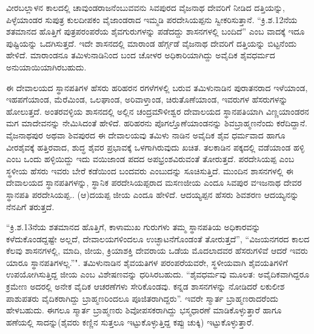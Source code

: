 ವೀರಬಲ್ಲಾಳನ ಕಾಲದಲ್ಲಿ ಚಾವುಂಡರಾಜನೆಂಬುವವನು ಸಿವಪುರದ ವೈಜನಾಥ ದೇವರಿಗೆ ನೀಡಿದ ದತ್ತಿಯನ್ನು, ಪಿಳ್ಳೆಯಾಂಡರ ಸುಪುತ್ರ ಕುಲದೀಪಕಂ ವೈಜಾಂಡರಾದ ಇಮ್ಮಡಿ ಪರದೇಸಿಯಪ್ಪನು ಸ್ವೀಕರಿಸುತ್ತಾನೆ. “ಕ್ರಿ.ಶ.12ನೆಯ ಶತಮಾನದ ಹೊತ್ತಿಗೆ ಪುತ್ರಪರಂಪರೆಯ ಶೈವಗುರುಗಳನ್ನು ಪಡೆದದ್ದು ಶಾಸನಗಳಲ್ಲಿ ಬಂದಿದೆ” ಎಂಬ ವಾದಕ್ಕೆ ಇದೂ ಪುಷ್ಟಿಯನ್ನು ಒದಗಿಸುತ್ತದೆ. ಇದೇ ಶಾಸನದಲ್ಲಿ ಮಾರಾಂಡ ಹೆರ್ಗ್ಗಡೆ ವೈಜನಾಥ ದೇವರಿಗೆ ದತ್ತಿಯನ್ನು ಬಿಟ್ಟನೆಂದು ಹೇಳಿದೆ. ಮಾರಾಂಡನೂ ತಮಿಳುನಾಡಿನಿಂದ ಬಂದ ಚೋಳರ ಅಧಿಕಾರಿಯಾಗಿದ್ದು ಅವೈದಿಕ ಶೈವಧರ್ಮದ ಅನುಯಾಯಿಯಾಗಿರ\-ಬಹುದು.

ಈ ದೇವಾಲಯದ ಸ್ಥಾನಪತಿಗಳ ಹೆಸರು ಹರಿಹರನ ರಗಳೆಗಳಲ್ಲಿ ಬರುವ ತಮಿಳುನಾಡಿನ ಪುರಾತನರಾದ ಇಳೆಯಾಂಡ, ಇಹಪಗೆಯಾಂಡ, ಮೆರೆಮಿಂಡ, ಒಲಘಾಂಡ, ಅರಿವಾಳ್ತಾಂಡ, ಚಿರುತೊಣೆಯಾಂಡ, ಇವರುಗಳ ಹೆಸರುಗಳನ್ನು ಹೋಲುತ್ತದೆ. ಅಂತರವಳ್ಳಿಯ ಶಾಸನದಲ್ಲಿ ಅಲ್ಲಿನ ಚಂದ್ರಮೌಳೀಶ್ವರ ದೇವಾಲಯದ ಸ್ಥಾನಪತಿಯಾಗಿ ವಿಣ್ಣಯಾಂಡರನ ಮಗ ಮಾದೇವನನ್ನು ನೇಮಿಸಿದಂತೆ ಹೇಳಿದೆ. ಹರಿಹರನು ಪೊಗಲ್ತೊಣೆಯಾಂಡನನ್ನು ಶಿವಬ್ರಾಹ್ಮಣನೆಂದು ಕರೆದಿದ್ದಾನೆ. ವೈಜನಾಥಪುರ ಅಥವಾ ಶಿವಪುರದ ಈ ದೇವಾಲಯವು ತಮಿಳು ನಾಡಿನ ಅವೈದಿಕ ಶೈವ ಧರ್ಮವಾದ ಹಾಗೂ ವೀರಶೈವಕ್ಕೆ ಹತ್ತಿರವಾದ, ಶುದ್ಧ ಶೈವರ ಪ್ರಭಾವಕ್ಕೆ ಒಳಗಾಗಿರುವುದು ಖಚಿತ. ತಲಕಾಡಿನ ಪಕ್ಕದಲ್ಲಿ ವಡೆಯಾಂಡ ಹಳ್ಳಿ ಎಂಬ ಒಂದು ಹಳ್ಳಿಯಿದ್ದು ಇದು ವಯಿಜಾಂಡ ಪದದ ಅಪಭ್ರಂಶವಿರುವಂತೆ ತೋರುತ್ತದೆ. ಪರದೇಸಿಯಪ್ಪ ಎಂಬ ಸ್ಥಳೀಯ ಹೆಸರು ಇವರು ಬೇರೆ ಕಡೆಯಿಂದ ಬಂದವರು ಎಂಬುದನ್ನು ಸೂಚಿಸುತ್ತಿದೆ. ಮುಂದಿನ ಶಾಸನಗಳಲ್ಲಿ ಈ ದೇವಾಲಯದ ಸ್ಥಾನಪತಿಗಳನ್ನು, ಸ್ಥಾನಿಕ ಪರದೇಸಿಯಪ್ಪರಾದ ಮಸಣಜೀಯ ಎಂದೂ ಸಿವಪುರ ವಇಜನಾಥ ದೇವರ ಸ್ಥಾನಪತಿ ಪರದೇಸಿಯಪ್ಪ.. (ಆ)ದಯಪ್ಪ ಜೀಯ ಎಂದೂ ಹೇಳಿದೆ. ಆದಯ್ಯಪ್ಪನ ಹೆಸರು ಶಿವಶರಣ ಆದಯ್ಯನನ್ನು ನೆನಪಿಗೆ ತರುತ್ತದೆ.


“ಕ್ರಿ.ಶ.13ನೆಯ ಶತಮಾನದ ಹೊತ್ತಿಗೆ, ಕಾಳಾಮುಖ ಗುರುಗಳು ತಮ್ಮ ಸ್ಥಾನಪತಿಯ ಅಧಿಕಾರವನ್ನು ಕಳೆದುಕೊಂಡ\-ದ್ದಷ್ಟೇ ಅಲ್ಲದೆ, ದೇವಾಲಯಗಳಿಂದಲೂ ಉಚ್ಛಾಟನೆಗೊಂಡಂತೆ ತೋರುತ್ತದೆ”, “ವಿಜಯನಗರದ ಕಾಲದ ಕೆಲವು ಶಾಸನಗಳಲ್ಲಿ, ಮಾದಿ, ಜೀಯ, ಕ್ರಿಯಾಶಕ್ತಿ ದೇವರಾಯ ಒಡೆಯ ಮೊದಲಾದವರ ಹೆಸರುಗಳಿವೆ ಆದರೆ ಇವರು ಯಾರೂ ಸ್ಥಾನಪತಿಗಳಲ್ಲ.”". ತಮಿಳುನಾಡಿನ ಶೈವಯತಿಗಳ ಪರಂಪರೆಯವರೇ, ಸ್ಥಳೀಯವಾಗಿ ಶೈವಯತಿಗಳಿಗೆ ಉಪಯೋಗಿಸು\-ತ್ತಿದ್ದ ಜೀಯ ಎಂಬ ವಿಶೇಷಣವನ್ನು ಧರಿಸಿರಬಹುದು. “ಶೈವಧರ್ಮವು ಮೂಲತ: ಅವೈದಿಕವಾಗಿದ್ದರೂ ಕ್ರಮೇಣ ಅದರಲ್ಲಿ ಅನೇಕ ವೈದಿಕ ಆಚರಣೆಗಳು ಸೇರಿಕೊಂಡವು. ಕನ್ನಡ ಶಾಸನಗಳನ್ನು ನೋಡಿದರೆ ಲಕುಲೀಶ ಪಾಶುಪತರು ವೈದಿಕರಾಗಿದ್ದು ಬ್ರಾಹ್ಮಣರಿಂದಲೂ ಪೂಜಿತರಾಗಿದ್ದರು”. ಇವರೇ ಸ್ಮಾರ್ತ ಬ್ರಾಹ್ಮಣರಾದರೆಂದು ಹೇಳಬಹುದು. ಈಗಲೂ ಸ್ಮಾರ್ತ ಬ್ರಾಹ್ಮಣರು ಶಿವೋಪಸಕರಾಗಿದ್ದು ಭಸ್ಮಧಾರಣೆ ಮಾಡಿಕೊಳ್ಳುತ್ತಾರೆ ಹಾಗೂ ಹಣೆಯಲ್ಲಿ ಸಾದನ್ನು(ಶೈವರು ಕಣ್ಣಿನ ಸುತ್ತಲೂ ಇಟ್ಟುಕೊಳ್ಳುತ್ತಿದ್ದ ಕಪ್ಪು ಚುಕ್ಕಿ) ಇಟ್ಟುಕೊಳ್ಳುತ್ತಾರೆ.

